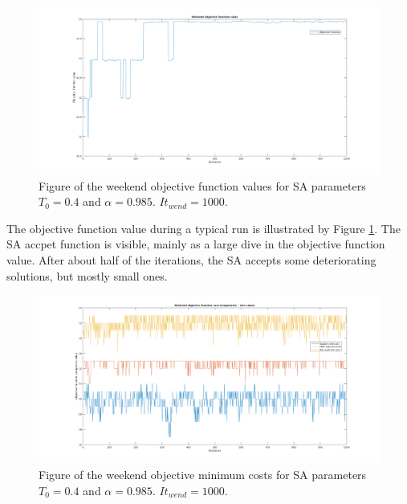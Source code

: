 \begin{figure}[!h]
\centering
\includegraphics[width=\textwidth, trim = 100px 50px 100px 20px, clip]{Chapters/ImagesEmelie/Plot_1000_20.png}
\caption{Figure of the weekend objective function values for SA parameters $T_0 = 0.4$ and $\alpha = 0.985$. $It_{wend} = 1000$.}
\label{fig:obj_fun_vals}
\end{figure}

The objective function value during a typical run is illustrated by Figure \ref{fig:obj_fun_vals}. The SA accpet function is visible, mainly as a large dive in the objective function value. After about half of the iterations, the SA accepts some deteriorating solutions, but mostly small ones.


\begin{figure}[!h]
\centering
\includegraphics[width=\textwidth, trim = 100px 50px 100px 20px, clip]{Chapters/ImagesEmelie/Components_1000_20.png}
\caption{Figure of the weekend objective minimum costs for SA parameters $T_0 = 0.4$ and $\alpha = 0.985$. $It_{wend} = 1000$.}
\label{fig:obj_fun_comp}
\end{figure}


